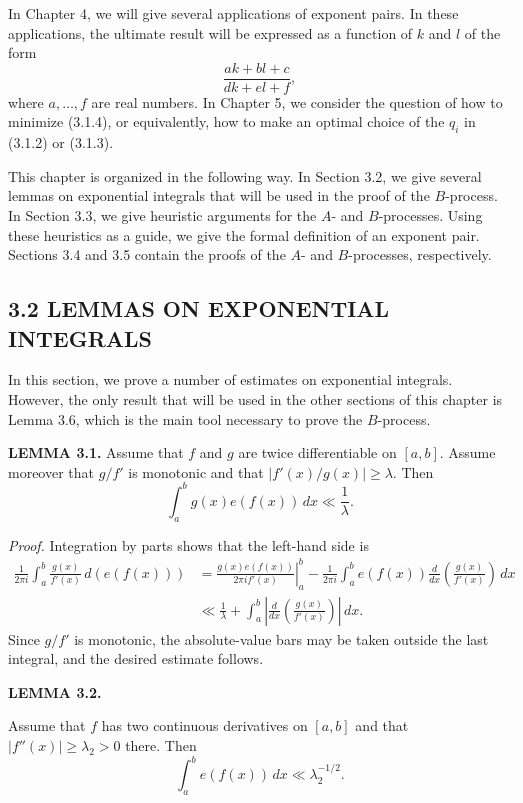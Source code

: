 \documentclass[10pt]{article}
\begin{document}
In Chapter 4, we will give several applications of exponent pairs. In these
applications, the ultimate result will be expressed as a function of $k$ and
$l$ of the form
\begin{equation*}
 \frac{ak+bl+c}{dk+el+f}, \tag{3.1.4}
\end{equation*}
where $a,\ldots,f$ are real numbers. In Chapter 5, we consider the question of
how to minimize (3.1.4), or equivalently, how to make an optimal choice of the
$q_i$ in (3.1.2) or (3.1.3).

This chapter is organized in the following way. In Section 3.2, we give
several lemmas on exponential integrals that will be used in the proof of the
$B$-process. In Section 3.3, we give heuristic arguments for the $A$- and
$B$-processes. Using these heuristics as a guide, we give the formal definition
of an exponent pair. Sections 3.4 and 3.5 contain the proofs of the $A$- and
$B$-processes, respectively.

\subsection*{3.2 LEMMAS ON EXPONENTIAL INTEGRALS}

In this section, we prove a number of estimates on exponential integrals.
However, the only result that will be used in the other sections of this
chapter is Lemma 3.6, which is the main tool necessary to prove the
$B$-process.

\medskip
\noindent\textbf{LEMMA 3.1.}
Assume that $f$ and $g$ are twice differentiable on $[a,b]$. Assume moreover
that $g/f'$ is monotonic and that $|f'(x)/g(x)|\geq\lambda$. Then
\[
 \int_a^b g(x)e(f(x))\,dx\ll\frac1\lambda.
\]

\noindent\textit{Proof.}
Integration by parts shows that the left-hand side is
\[
\begin{aligned}
 \frac{1}{2\pi i}\int_a^b\frac{g(x)}{f'(x)}\,d(e(f(x)))
 &=\left.\frac{g(x)e(f(x))}{2\pi i f'(x)}\right|_a^b
   -\frac{1}{2\pi i}\int_a^b e(f(x))
       \frac{d}{dx}\left(\frac{g(x)}{f'(x)}\right)\,dx \\
 &\ll \frac1\lambda+
   \int_a^b\left|\frac{d}{dx}\left(\frac{g(x)}{f'(x)}\right)\right|\,dx.
\end{aligned}
\]
Since $g/f'$ is monotonic, the absolute-value bars may be taken outside the
last integral, and the desired estimate follows.

\medskip
\noindent\textbf{LEMMA 3.2.}\par\noindent
Assume that $f$ has two continuous derivatives on $[a,b]$ and that
$|f''(x)|\geq\lambda_2>0$ there. Then
\[
 \int_a^b e(f(x))\,dx\ll\lambda_2^{-1/2}.
\]
\end{document}

